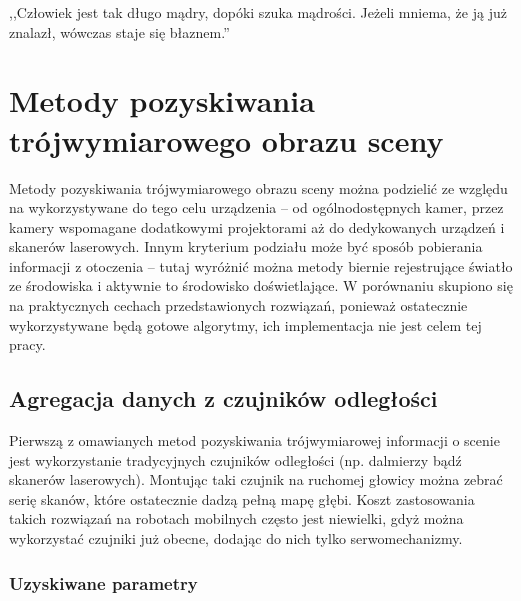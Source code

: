 

\begin{savequote}[70mm]
,,Człowiek jest tak długo mądry, dopóki szuka mądrości. Jeżeli mniema, że ją już
znalazł, wówczas staje się błaznem.''
\end{savequote}

\chapter{Metody pozyskiwania trójwymiarowego obrazu sceny}
\label{chap:porownanie}


Metody pozyskiwania trójwymiarowego obrazu sceny można podzielić ze względu
na wykorzystywane do tego celu urządzenia -- od ogólnodostępnych kamer, przez
kamery wspomagane dodatkowymi projektorami aż do dedykowanych urządzeń i
skanerów laserowych. Innym kryterium podziału może być sposób pobierania
informacji z otoczenia -- tutaj wyróżnić można metody biernie rejestrujące
światło ze środowiska i aktywnie to środowisko doświetlające. W porównaniu
skupiono się na praktycznych cechach przedstawionych rozwiązań, ponieważ
ostatecznie wykorzystywane będą gotowe algorytmy, ich implementacja nie jest
celem tej pracy.

\section{Agregacja danych z czujników odległości}

Pierwszą z omawianych metod pozyskiwania trójwymiarowej informacji o scenie jest
wykorzystanie tradycyjnych czujników odległości (np. dalmierzy bądź skanerów
laserowych). Montując taki czujnik na ruchomej głowicy można zebrać serię
skanów, które ostatecznie dadzą pełną mapę głębi. Koszt zastosowania takich
rozwiązań na robotach mobilnych często jest niewielki, gdyż można wykorzystać
czujniki już obecne, dodając do nich tylko serwomechanizmy.

\subsection{Uzyskiwane parametry}

